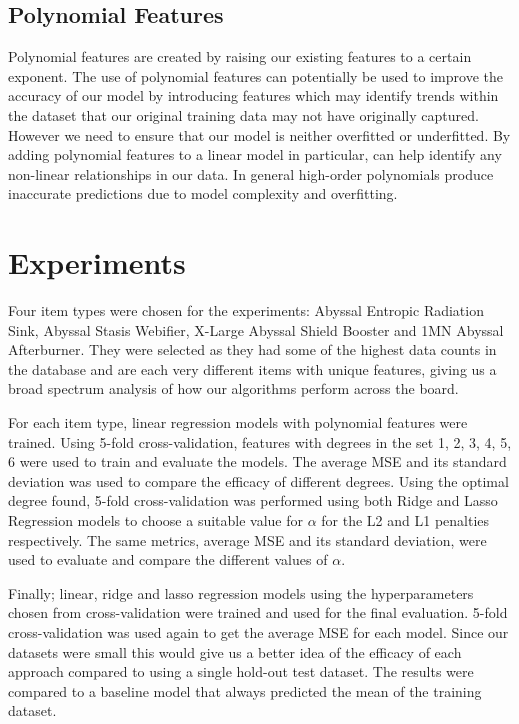 \documentclass[10pt]{article}
\begin{document}
	\subsection{Polynomial Features}
		Polynomial features are created by raising our existing features to a certain exponent. The use of polynomial features can potentially be used to improve the accuracy of our model by introducing features which may identify trends within the dataset that our original training data may not have originally captured. However we need to ensure that our model is neither overfitted or underfitted. By adding polynomial features to a linear model in particular, can help identify any non-linear relationships in our data. In general high-order polynomials produce inaccurate predictions due to model complexity and overfitting.
		
\section{Experiments}
	Four item types were chosen for the experiments: Abyssal Entropic Radiation Sink, Abyssal Stasis Webifier, X-Large Abyssal Shield Booster and 1MN Abyssal Afterburner. They were selected as they had some of the highest data counts in the database and are each very different items with unique features, giving us a broad spectrum analysis of how our algorithms perform across the board.
	
	For each item type, linear regression models with polynomial features were trained. Using 5-fold cross-validation, features with degrees in the set {1, 2, 3, 4, 5, 6} were used to train and evaluate the models. The average MSE and its standard deviation was used to compare the efficacy of different degrees. Using the optimal degree found, 5-fold cross-validation was performed using both Ridge and Lasso Regression models to choose a suitable value for $\alpha$ for the L2 and L1 penalties respectively. The same metrics, average MSE and its standard deviation, were used to evaluate and compare the different values of $\alpha$.
	
	Finally; linear, ridge and lasso regression models using the hyperparameters chosen from cross-validation were trained and used for the final evaluation. 5-fold cross-validation was used again to get the average MSE for each model. Since our datasets were small this would give us a better idea of the efficacy of each approach compared to using a single hold-out test dataset. The results were compared to a baseline model that always predicted the mean of the training dataset.
	
\end{document}
